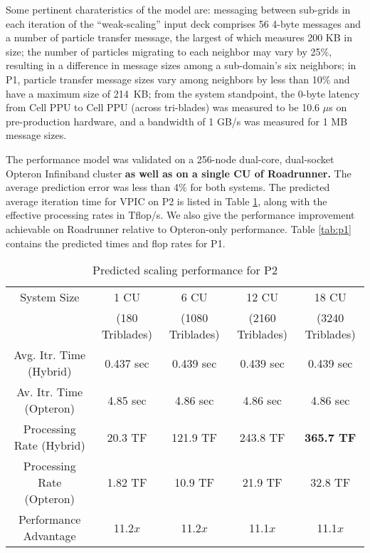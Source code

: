 \documentclass[letter,10pt]{article}
\begin{document}
Some pertinent charateristics of the model are:  
messaging between sub-grids in each 
iteration of the ``weak-scaling'' input deck comprises 56 4-byte messages 
and a number of particle transfer message, the largest of which measures 
200 KB in size; the number of particles migrating to each neighbor may 
vary by 25\%, resulting in a difference in message sizes among a 
sub-domain's six neighbors; in P1, particle transfer 
message sizes vary among neighbors by less than 10\% and have a maximum 
size of 214~KB; from the system standpoint, the 0-byte latency from Cell 
PPU to Cell PPU (across tri-blades) was measured to be 10.6 $\mu$s on 
pre-production hardware, and a bandwidth of 1 GB/s was measured for 
1 MB message sizes. 

The performance model was validated on a 256-node dual-core, dual-socket 
Opteron Infiniband cluster \textbf{as well as on a single CU of Roadrunner.}  
The average prediction error was less than 4\% for both systems.  The 
predicted average iteration time for VPIC on P2 
is listed in Table \ref{tab:p2}, along with the effective processing rates 
in Tflop/s.  We also give the performance improvement achievable on 
Roadrunner relative to Opteron-only performance.  Table 
\ref{tab:p1} contains the predicted times and flop rates for P1. 

\begin{table}
\begin{center}
\begin{tabular}{c c c c c}
\hline
\hline
 System Size & 1 CU & 6 CU & 12 CU & 18 CU \\
             & (180 Triblades) & (1080 Triblades) & (2160 Triblades) & (3240 Triblades) \\
\hline
Avg. Itr. Time (Hybrid) & 0.437 sec & 0.439 sec & 0.439 sec & 0.439 sec \\
Av. Itr. Time (Opteron) & 4.85 sec & 4.86 sec & 4.86 sec & 4.86 sec \\
Processing Rate (Hybrid) & 20.3 TF & 121.9 TF & 243.8 TF & \textbf{365.7 TF} \\
Processing Rate (Opteron) & 1.82 TF & 10.9 TF & 21.9 TF & 32.8 TF \\
Performance Advantage & 11.2$x$ & 11.2$x$ & 11.1$x$ & 11.1$x$ \\
\hline
\end{tabular}
\end{center}
\caption{Predicted scaling performance for P2}
\label{tab:p2}
\end{table}
\end{document}

